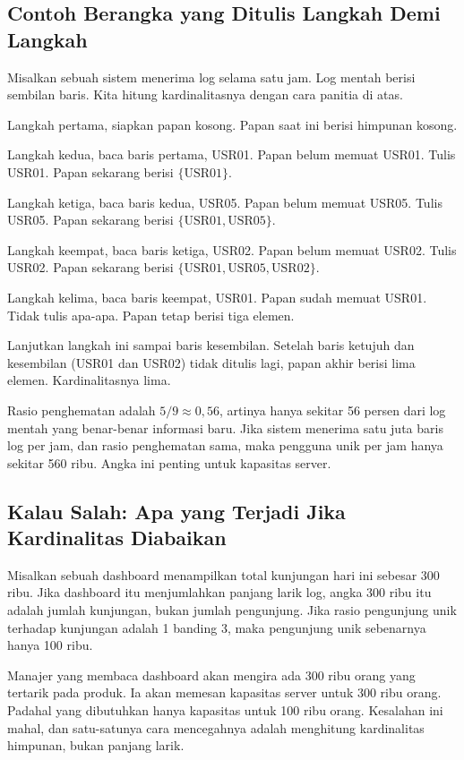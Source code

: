 \documentclass[11pt,a4paper]{article}
\begin{document}
\subsection{Contoh Berangka yang Ditulis Langkah Demi Langkah}

Misalkan sebuah sistem menerima log selama satu jam. Log mentah berisi sembilan baris. Kita hitung kardinalitasnya dengan cara panitia di atas.

Langkah pertama, siapkan papan kosong. Papan saat ini berisi himpunan kosong.

Langkah kedua, baca baris pertama, USR01. Papan belum memuat USR01. Tulis USR01. Papan sekarang berisi $\{\text{USR01}\}$.

Langkah ketiga, baca baris kedua, USR05. Papan belum memuat USR05. Tulis USR05. Papan sekarang berisi $\{\text{USR01},\text{USR05}\}$.

Langkah keempat, baca baris ketiga, USR02. Papan belum memuat USR02. Tulis USR02. Papan sekarang berisi $\{\text{USR01},\text{USR05},\text{USR02}\}$.

Langkah kelima, baca baris keempat, USR01. Papan sudah memuat USR01. Tidak tulis apa-apa. Papan tetap berisi tiga elemen.

Lanjutkan langkah ini sampai baris kesembilan. Setelah baris ketujuh dan kesembilan (USR01 dan USR02) tidak ditulis lagi, papan akhir berisi lima elemen. Kardinalitasnya lima.

Rasio penghematan adalah $5/9 \approx 0{,}56$, artinya hanya sekitar 56 persen dari log mentah yang benar-benar informasi baru. Jika sistem menerima satu juta baris log per jam, dan rasio penghematan sama, maka pengguna unik per jam hanya sekitar 560 ribu. Angka ini penting untuk kapasitas server.

\subsection{Kalau Salah: Apa yang Terjadi Jika Kardinalitas Diabaikan}

Misalkan sebuah dashboard menampilkan total kunjungan hari ini sebesar 300 ribu. Jika dashboard itu menjumlahkan panjang larik log, angka 300 ribu itu adalah jumlah kunjungan, bukan jumlah pengunjung. Jika rasio pengunjung unik terhadap kunjungan adalah 1 banding 3, maka pengunjung unik sebenarnya hanya 100 ribu.

Manajer yang membaca dashboard akan mengira ada 300 ribu orang yang tertarik pada produk. Ia akan memesan kapasitas server untuk 300 ribu orang. Padahal yang dibutuhkan hanya kapasitas untuk 100 ribu orang. Kesalahan ini mahal, dan satu-satunya cara mencegahnya adalah menghitung kardinalitas himpunan, bukan panjang larik.
\end{document}
